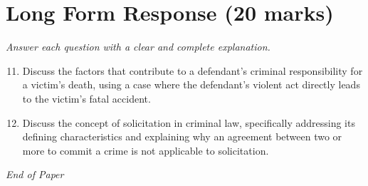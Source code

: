 \documentclass[12pt]{article}
\begin{document}
\section*{Long Form Response (20 marks)}
\textit{Answer each question with a clear and complete explanation.}
\begin{enumerate}[label=\arabic*.]
\setcounter{enumi}{10}
\item Discuss the factors that contribute to a defendant's criminal responsibility for a victim's death, using a case where the defendant's violent act directly leads to the victim's fatal accident.
\item Discuss the concept of solicitation in criminal law, specifically addressing its defining characteristics and explaining why an agreement between two or more to commit a crime is not applicable to solicitation.
\end{enumerate}

\vfill
\noindent\textit{End of Paper}
\end{document}
